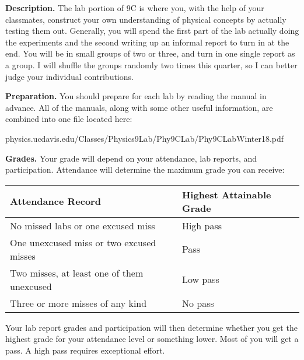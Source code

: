 \documentclass[letterpaper, 11pt]{article}
\begin{document}
\setlength{\headheight}{14pt}
\insertTitle

\textbf{Description.} The lab portion of 9C is where you, with the help of your classmates, construct your own understanding of physical concepts by actually testing them out. Generally, you will spend the first part of the lab actually doing the experiments and the second writing up an informal report to turn in at the end. You will be in small groups of two or three, and turn in one single report as a group. I will shuffle the groups randomly two times this quarter, so I can better judge your individual contributions.

\textbf{Preparation.} You should prepare for each lab by reading the manual in advance. All of the manuals, along with some other useful information, are combined into one file located here:

\begin{center}
    physics.ucdavis.edu/Classes/Physics9Lab/Phy9CLab/Phy9CLabWinter18.pdf
\end{center}

\textbf{Grades.} Your grade will depend on your attendance, lab reports, and participation. Attendance will determine the maximum grade you can receive:
\begin{table}[H]
    \centering
    \begin{tabular}{ll}
        \textbf{Attendance Record} & \textbf{Highest Attainable Grade} \\
        \toprule
        No missed labs or one excused miss & High pass \\
        One unexcused miss or two excused misses & Pass \\
        Two misses, at least one of them unexcused & Low pass \\
        Three or more misses of any kind & No pass \\
        \bottomrule
    \end{tabular}
\end{table}

Your lab report grades and participation will then determine whether you get the highest grade for your attendance level or something lower. Most of you will get a pass. A high pass requires exceptional effort.
\end{document}

